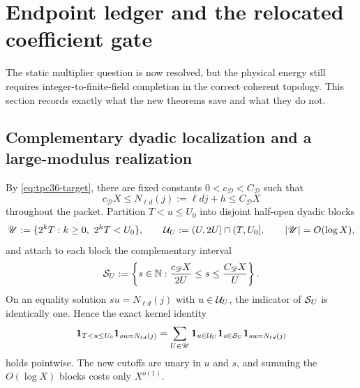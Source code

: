 \section{Endpoint ledger and the relocated coefficient gate}
\label{sec:tpc36-next-gate}

The static multiplier question is now resolved, but the physical energy
still requires integer-to-finite-field completion in the correct coherent
topology.  This section records exactly what the new theorems save and
what they do not.

\subsection{Complementary dyadic localization and a large-modulus realization}

By \eqref{eq:tpc36-target}, there are fixed constants
\(0<c_{\mathscr D}<C_{\mathscr D}\) such that
\begin{equation}
 c_{\mathscr D}X
 \le N_{\ell d}(j):=\ell dj+h
 \le C_{\mathscr D}X
 \label{eq:tpc36-target-support-constants}
\end{equation}
throughout the packet.  Partition \(T<u\le U_0\) into disjoint half-open
dyadic blocks
\begin{equation}
 \mathscr U:=\{2^kT:k\ge0,\ 2^kT<U_0\},
 \qquad
 \mathcal U_U:=(U,2U]\cap(T,U_0],
 \qquad |\mathscr U|=O(\log X),
 \label{eq:tpc36-u-dyadic-blocks}
\end{equation}
and attach to each block the complementary interval
\begin{equation}
 \mathcal S_U:=
 \left\{s\in\mathbb N:
 \frac{c_{\mathscr D}X}{2U}\le s
 \le\frac{C_{\mathscr D}X}{U}\right\}.
 \label{eq:tpc36-s-complementary-block}
\end{equation}
On an equality solution \(su=N_{\ell d}(j)\) with \(u\in\mathcal U_U\), the
indicator of \(\mathcal S_U\) is identically one.  Hence the exact kernel identity
\begin{equation}
 \mathbf 1_{T<u\le U_0}\mathbf 1_{su=N_{\ell d}(j)}
 =
 \sum_{U\in\mathscr U}
 \mathbf 1_{u\in\mathcal U_U}\mathbf 1_{s\in\mathcal S_U}
 \mathbf 1_{su=N_{\ell d}(j)}
 \label{eq:tpc36-reciprocal-dyadic-identity}
\end{equation}
holds pointwise.  The new cutoffs are unary in \(u\) and \(s\), and
summing the \(O(\log X)\) blocks costs only \(X^{o(1)}\).

